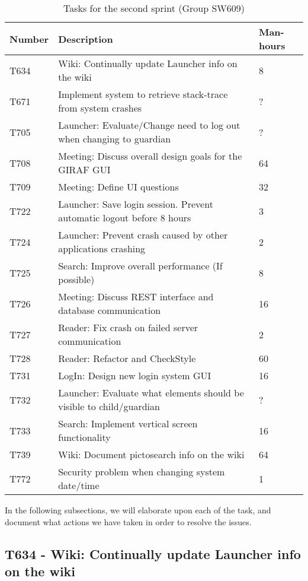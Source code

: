 \begin{table}[H]
\centering
\begin{tabular}{|l|l|l|}
\hline
Number	& Description & Man-hours												\\\hline
T634  	& Wiki: Continually update Launcher info on the wiki & 8\\\hline 
T671    & Implement system to retrieve stack-trace from system crashes & ?
\\\hline 
T705	& Launcher: Evaluate/Change need to log out when changing  to guardian
& ? \\\hline 
T708    & Meeting: Discuss overall design goals for the GIRAF GUI & 64\\\hline
T709	& Meeting: Define UI questions & 32 \\\hline 
T722   	& Launcher: Save login session. Prevent automatic logout before 8 hours
&3 \\\hline 
T724   	& Launcher: Prevent crash caused by other applications
crashing & 2 \\\hline 
T725  	& Search: Improve overall performance (If possible)	& 8 \\\hline 
T726    & Meeting: Discuss REST interface and database communication & 16
\\\hline 
T727    & Reader: Fix crash on failed server communication  & 2				\\\hline 
T728	& Reader: Refactor and CheckStyle  & 60\\\hline
T731    & LogIn: Design new login system GUI & 16     			\\\hline
T732    & Launcher: Evaluate what elements should be visible to
child/guardian & ?\\\hline 
T733    & Search: Implement vertical screen functionality & 16   			\\\hline 
T739    & Wiki: Document pictosearch info on the wiki & 64	\\\hline
T772    & Security problem when changing system date/time & 1 \\\hline
\end{tabular}
\caption{Tasks for the second sprint (Group SW609)} 
\label{SprintTwoTasks}    
\end{table} 

In the following subsections, we will elaborate upon each of the task, and
document what actions we have taken in order to resolve the issues.

\newpage
\subsection{T634 - Wiki: Continually update Launcher info on the wiki}

